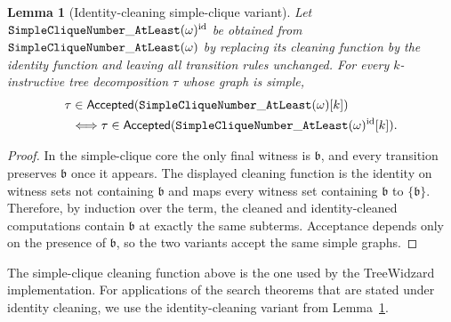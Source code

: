 \documentclass[11pt,a4paper]{article}
\newtheorem{lemma}[theorem]{Lemma}
\newcommand{\treewidthvalue}{k}
\newcommand{\accepteddecompositions}[1]{\mathsf{Accepted}(#1)}
\newcommand{\abstractdecomposition}{\tau}
\newcommand{\dpNamePart}[1]{\mbox{\normalfont\ttfamily #1}}
\newcommand{\simpleCliqueNumberAtLeastCore}[1]{\dpNamePart{SimpleCliqueNumber}\_\allowbreak\dpNamePart{AtLeast}(#1)}
\newcommand{\cliqueparameter}{\omega}
\newcommand{\cliquefound}{\mathfrak{b}}
\begin{document}
%
\begin{lemma}[Identity-cleaning simple-clique variant]
\label{lemma:identity-cleaning-simple-clique}
Let $\simpleCliqueNumberAtLeastCore{\cliqueparameter}^{\mathrm{id}}$ be obtained from $\simpleCliqueNumberAtLeastCore{\cliqueparameter}$ by replacing its cleaning function by the identity function and leaving all transition rules unchanged.
For every $\treewidthvalue$-instructive tree decomposition $\abstractdecomposition$ whose graph is simple,
\begin{align*}
\abstractdecomposition
&\in\accepteddecompositions{\simpleCliqueNumberAtLeastCore{\cliqueparameter}[\treewidthvalue]}\\
&\Longleftrightarrow
\abstractdecomposition
\in\accepteddecompositions{\simpleCliqueNumberAtLeastCore{\cliqueparameter}^{\mathrm{id}}[\treewidthvalue]}.
\end{align*}
\end{lemma}
\begin{proof}
In the simple-clique core the only final witness is $\cliquefound$, and every transition preserves $\cliquefound$ once it appears.
The displayed cleaning function is the identity on witness sets not containing $\cliquefound$ and maps every witness set containing $\cliquefound$ to $\{\cliquefound\}$.
Therefore, by induction over the term, the cleaned and identity-cleaned computations contain $\cliquefound$ at exactly the same subterms.
Acceptance depends only on the presence of $\cliquefound$, so the two variants accept the same simple graphs.
\end{proof}

The simple-clique cleaning function above is the one used by the TreeWidzard implementation. For applications of the search theorems that are stated under identity cleaning, we use the identity-cleaning variant from Lemma~\ref{lemma:identity-cleaning-simple-clique}.
\end{document}
